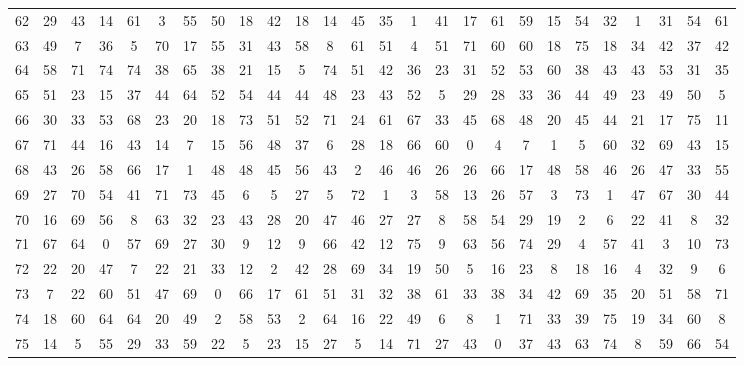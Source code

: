 \begin{table}
\begin{tabular}{c c c c c c c c c c c c c c c c c c c c c c c c c c }
62 & 29 & 43 & 14 & 61 & 3 & 55 & 50 & 18 & 42 & 18 & 14 & 45 & 35 & 1 & 41 & 17 & 61 & 59 & 15 & 54 & 32 & 1 & 31 & 54 & 61 \\
63 & 49 & 7 & 36 & 5 & 70 & 17 & 55 & 31 & 43 & 58 & 8 & 61 & 51 & 4 & 51 & 71 & 60 & 60 & 18 & 75 & 18 & 34 & 42 & 37 & 42 \\
64 & 58 & 71 & 74 & 74 & 38 & 65 & 38 & 21 & 15 & 5 & 74 & 51 & 42 & 36 & 23 & 31 & 52 & 53 & 60 & 38 & 43 & 43 & 53 & 31 & 35 \\
65 & 51 & 23 & 15 & 37 & 44 & 64 & 52 & 54 & 44 & 44 & 48 & 23 & 43 & 52 & 5 & 29 & 28 & 33 & 36 & 44 & 49 & 23 & 49 & 50 & 5 \\
66 & 30 & 33 & 53 & 68 & 23 & 20 & 18 & 73 & 51 & 52 & 71 & 24 & 61 & 67 & 33 & 45 & 68 & 48 & 20 & 45 & 44 & 21 & 17 & 75 & 11 \\
67 & 71 & 44 & 16 & 43 & 14 & 7 & 15 & 56 & 48 & 37 & 6 & 28 & 18 & 66 & 60 & 0 & 4 & 7 & 1 & 5 & 60 & 32 & 69 & 43 & 15 \\
68 & 43 & 26 & 58 & 66 & 17 & 1 & 48 & 48 & 45 & 56 & 43 & 2 & 46 & 46 & 26 & 26 & 66 & 17 & 48 & 58 & 46 & 26 & 47 & 33 & 55 \\
69 & 27 & 70 & 54 & 41 & 71 & 73 & 45 & 6 & 5 & 27 & 5 & 72 & 1 & 3 & 58 & 13 & 26 & 57 & 3 & 73 & 1 & 47 & 67 & 30 & 44 \\
70 & 16 & 69 & 56 & 8 & 63 & 32 & 23 & 43 & 28 & 20 & 47 & 46 & 27 & 27 & 8 & 58 & 54 & 29 & 19 & 2 & 6 & 22 & 41 & 8 & 32 \\
71 & 67 & 64 & 0 & 57 & 69 & 27 & 30 & 9 & 12 & 9 & 66 & 42 & 12 & 75 & 9 & 63 & 56 & 74 & 29 & 4 & 57 & 41 & 3 & 10 & 73 \\
72 & 22 & 20 & 47 & 7 & 22 & 21 & 33 & 12 & 2 & 42 & 28 & 69 & 34 & 19 & 50 & 5 & 16 & 23 & 8 & 18 & 16 & 4 & 32 & 9 & 6 \\
73 & 7 & 22 & 60 & 51 & 47 & 69 & 0 & 66 & 17 & 61 & 51 & 31 & 32 & 38 & 61 & 33 & 38 & 34 & 42 & 69 & 35 & 20 & 51 & 58 & 71 \\
74 & 18 & 60 & 64 & 64 & 20 & 49 & 2 & 58 & 53 & 2 & 64 & 16 & 22 & 49 & 6 & 8 & 1 & 71 & 33 & 39 & 75 & 19 & 34 & 60 & 8 \\
75 & 14 & 5 & 55 & 29 & 33 & 59 & 22 & 5 & 23 & 15 & 27 & 5 & 14 & 71 & 27 & 43 & 0 & 37 & 43 & 63 & 74 & 8 & 59 & 66 & 54 \\
\hline
\end{tabular}
\end{table}